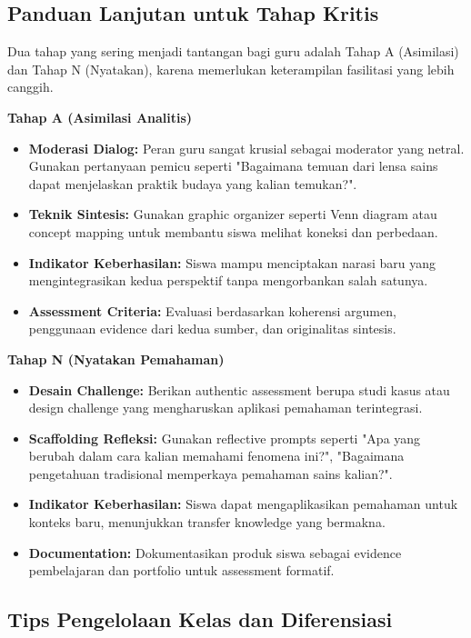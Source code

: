 \documentclass[12pt,a4paper,oneside]{book}
\begin{document}
\subsection{Panduan Lanjutan untuk Tahap Kritis}

Dua tahap yang sering menjadi tantangan bagi guru adalah Tahap A (Asimilasi) dan Tahap N (Nyatakan), karena memerlukan keterampilan fasilitasi yang lebih canggih.

\textbf{Tahap A (Asimilasi Analitis)}
\begin{itemize}
\item \textbf{Moderasi Dialog:} Peran guru sangat krusial sebagai moderator yang netral. Gunakan pertanyaan pemicu seperti "Bagaimana temuan dari lensa sains dapat menjelaskan praktik budaya yang kalian temukan?".
\item \textbf{Teknik Sintesis:} Gunakan graphic organizer seperti Venn diagram atau concept mapping untuk membantu siswa melihat koneksi dan perbedaan.
\item \textbf{Indikator Keberhasilan:} Siswa mampu menciptakan narasi baru yang mengintegrasikan kedua perspektif tanpa mengorbankan salah satunya.
\item \textbf{Assessment Criteria:} Evaluasi berdasarkan koherensi argumen, penggunaan evidence dari kedua sumber, dan originalitas sintesis.
\end{itemize}

\textbf{Tahap N (Nyatakan Pemahaman)}
\begin{itemize}
\item \textbf{Desain Challenge:} Berikan authentic assessment berupa studi kasus atau design challenge yang mengharuskan aplikasi pemahaman terintegrasi.
\item \textbf{Scaffolding Refleksi:} Gunakan reflective prompts seperti "Apa yang berubah dalam cara kalian memahami fenomena ini?", "Bagaimana pengetahuan tradisional memperkaya pemahaman sains kalian?".
\item \textbf{Indikator Keberhasilan:} Siswa dapat mengaplikasikan pemahaman untuk konteks baru, menunjukkan transfer knowledge yang bermakna.
\item \textbf{Documentation:} Dokumentasikan produk siswa sebagai evidence pembelajaran dan portfolio untuk assessment formatif.
\end{itemize}

\subsection{Tips Pengelolaan Kelas dan Diferensiasi}
\end{document}
